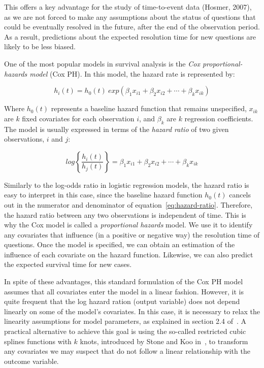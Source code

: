 \documentclass{chi2012}
\begin{document}
This offers a key advantage for the study of time-to-event data (Hosmer, 2007), as we 
are not forced to make any assumptions about the status of questions that could be 
eventually resolved in the future, after the end of the observation period. As a result, predictions  about the expected resolution time 
for new questions are likely to be less biased.

One of the most popular models in survival analysis is the \textit{Cox proportional-hazards
model} (Cox PH). In this model, the hazard rate is represented by:

\begin{equation}
    h_{i}(t) = h_{0}(t)\: exp\left(\beta_{1}x_{i1}+\beta_{2}x_{i2}+\cdots+\beta_{k}x_{ik}\right)
\end{equation}

Where $h_{0}(t)$ represents a baseline hazard function that remains
unspecified, $x_{ik}$ are $k$ fixed covariates for each observation
$i$, and $\beta_{k}$ are $k$ regression coefficients. The model is usually expressed
in terms of the \textit{hazard ratio} of two given observations, $i$ and $j$:

\begin{equation}
    log\left\{\frac{h_{i}(t)}{h_{j}(t)}\right\} = \beta_{1}x_{i1}+\beta_{2}x_{i2}+\cdots+\beta_{k}x_{ik}
\label{eq:hazard-ratio}
\end{equation}

Similarly to the log-odds ratio in logistic regression models, the
hazard ratio is easy to interpret in this case, since the baseline
hazard function $h_{0}(t)$ cancels out in the numerator and denominator of
equation~\ref{eq:hazard-ratio}. Therefore, the hazard ratio between any
two observations is independent of time. This is why the
Cox model is called a \textit{proportional hazards} model. We use it
to identify any covariates that influence (in a positive or
negative way) the resolution time of questions. Once the model is specified, 
we can obtain an estimation of the influence of each covariate on the hazard
function. Likewise, we can also predict the expected survival time for new 
cases.

In spite of these advantages, this standard formulation of the Cox PH model 
assumes that all covariates enter the model in a linear fashion. However, it 
is quite frequent that the log hazard ration (output variable) does not depend 
linearly on some of the model's covariates. In this case, it is necessary 
to relax the linearity assumptions for model parameters, as explained 
in section 2.4 of~\cite{harrell2001}. A practical alternative to achieve this
goal is using the so-called restricted cubic splines functions with $k$ knots,
introduced by Stone and Koo in~\cite{stone1985}, to transform any covariates we 
may suspect that do not follow a linear relationship with the outcome variable.
\end{document}
